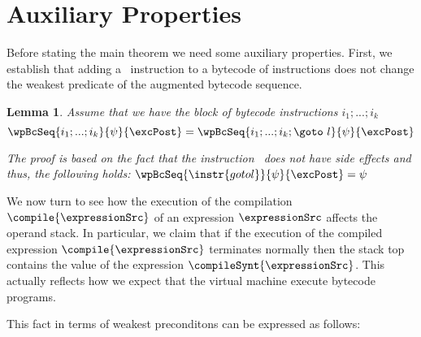 

\newtheorem{interProp}{Lemma} %

\newtheorem{exprValueOnStack}[interProp]{Lemma}
\newtheorem{wpStmtBcSrc1}[interProp]{Lemma}
\newtheorem{wpStmtBcSrc2}[interProp]{Lemma}


\section{Auxiliary Properties}

Before stating the main theorem we need some auxiliary properties.
 First, we establish that adding a  \ instruction  to a bytecode of instructions does not change the weakest predicate of the
 augmented bytecode sequence.  


\begin{interProp} \label{interProp}
Assume that we have the block of bytecode instructions $i_1;...;i_k$ 
     $$ \wpBcSeq{ i_1;...;i_k}{ \psi  }  { \excPost } = 
\wpBcSeq{i_1;...;i_k; \goto \  l }{\psi }{\excPost} $$

The proof is based on the fact that the instruction \goto \ does not have side effects and thus,
the following holds: $ \wpBcSeq{ \instr{goto l}}{\psi}{\excPost} = \psi $
\end{interProp}


We now turn to see how the execution of the compilation  $\compile{\expressionSrc}$ of an expression 
$\expressionSrc$ affects the operand stack. In particular, we claim that if the execution of the compiled expression 
 $\compile{\expressionSrc}$ terminates normally then the stack top contains the value of the expression $\compileSynt{\expressionSrc}$.
This actually reflects how we expect that the virtual machine execute bytecode programs.

 This fact in terms of weakest 
preconditons can be expressed as follows: 


